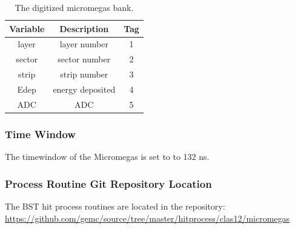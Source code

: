 \begin{table}[h]
	\begin{center}
		\begin{tabular}{| c | c | c |}
			\hline \hline
			Variable         & Description  & Tag  \\
			\hline
              layer  &                                      layer number  &    1   \\
             sector  &                                     sector number  &    2   \\
              strip  &                                      strip number  &    3   \\
               Edep  &                                  energy deposited  &    4   \\
                ADC  &                                               ADC  &    5   \\
			\hline \hline
		\end{tabular}
	\end{center}
	\caption{The digitized micromegas bank.}\label{tab:mmBank}
\end{table}

\subsubsection{Time Window}
The timewindow of the Micromegas is set to to 132 ns.

\subsubsection{Process Routine Git Repository Location}
The BST hit process routines are located in the repository: \url{https://github.com/gemc/source/tree/master/hitprocess/clas12/micromegas}

